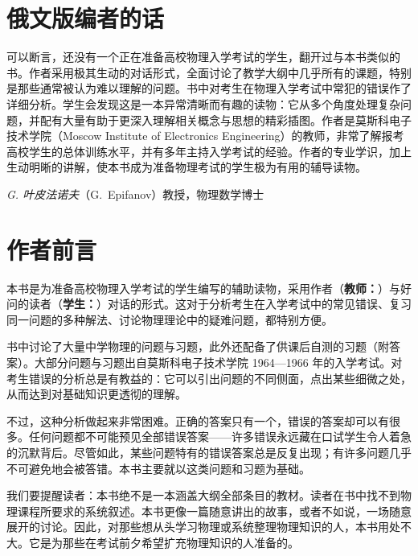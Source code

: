 
\vspace*{1cm}

\chapter[俄文版编者的话]{俄文版编者的话}
\label{preface}

可以断言，还没有一个正在准备高校物理入学考试的学生，翻开过与本书类似的书。作者采用极其生动的对话形式，全面讨论了教学大纲中几乎所有的课题，特别是那些通常被认为难以理解的问题。书中对考生在物理入学考试中常犯的错误作了详细分析。学生会发现这是一本异常清晰而有趣的读物：它从多个角度处理复杂问题，并配有大量有助于更深入理解相关概念与思想的精彩插图。作者是莫斯科电子技术学院（Moscow Institute of Electronics Engineering）的教师，非常了解报考高校学生的总体训练水平，并有多年主持入学考试的经验。作者的专业学识，加上生动明晰的讲解，使本书成为准备物理考试的学生极为有用的辅导读物。\\
\begin{flushright}
\emph{G. 叶皮法诺夫}（G.~Epifanov）教授，物理数学博士
\end{flushright}

\chapter{作者前言}
\label{foreword}

本书是为准备高校物理入学考试的学生编写的辅助读物，采用作者（\textbf{教师：}）与好问的读者（\textbf{学生：}）对话的形式。这对于分析考生在入学考试中的常见错误、复习同一问题的多种解法、讨论物理理论中的疑难问题，都特别方便。

书中讨论了大量中学物理的问题与习题，此外还配备了供课后自测的习题（附答案）。大部分问题与习题出自莫斯科电子技术学院 1964—1966 年的入学考试。对考生错误的分析总是有教益的：它可以引出问题的不同侧面，点出某些细微之处，从而达到对基础知识更透彻的理解。


不过，这种分析做起来非常困难。正确的答案只有一个，错误的答案却可以有很多。任何问题都不可能预见全部错误答案——许多错误永远藏在口试学生令人着急的沉默背后。尽管如此，某些问题特有的错误答案总是反复出现；有许多问题几乎不可避免地会被答错。本书主要就以这类问题和习题为基础。

我们要提醒读者：本书绝不是一本涵盖大纲全部条目的教材。读者在书中找不到物理课程所要求的系统叙述。本书更像一篇随意讲出的故事，或者不如说，一场随意展开的讨论。因此，对那些想从头学习物理或系统整理物理知识的人，本书用处不大。它是为那些在考试前夕希望扩充物理知识的人准备的。

